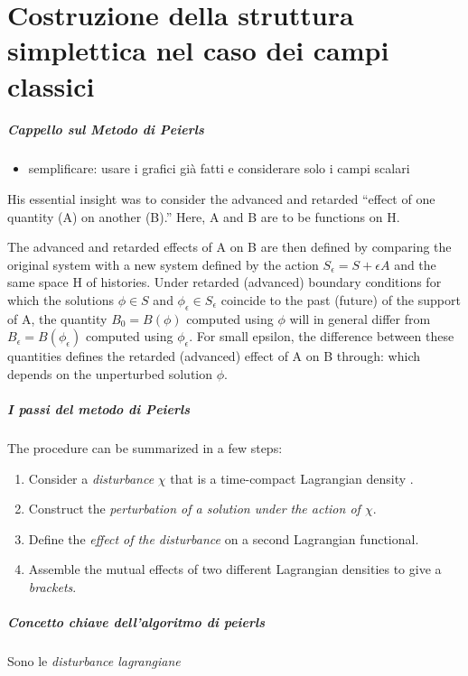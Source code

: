 \documentclass{beamer}
\begin{document}
	\part{Costruzione della struttura simplettica nel caso dei campi classici}
	\frame{\partpage}
	
	\begin{frame}
		\frametitle{Cappello sul Metodo di Peierls }
			\begin{itemize}
				\item semplificare: usare i grafici già fatti e considerare solo i campi scalari
			\end{itemize}
			His essential insight was to consider the advanced and retarded “effect of one quantity (A) on another (B).” Here, A and B are to
be functions on H. 

			The advanced  and retarded  effects of A on B are then defined by comparing the original system with a new system defined by the action $S_\epsilon = S + \epsilon A$ and the same space H of histories. 
			Under retarded (advanced) boundary conditions for which the solutions $\phi \in S$ and $\phi_\epsilon	\in S_\epsilon$ coincide to the past (future) of the support of A, the quantity $B_0 = B(\phi)$ computed using $\phi$ will in general differ from $B_\epsilon = B(\phi_\epsilon)$ computed using $\phi_\epsilon$.
			For small epsilon, the difference between these quantities defines the retarded (advanced) effect of A on B through:
which depends on the unperturbed solution $\phi$.
	\end{frame}
	
	\begin{frame}
		\frametitle{I passi del metodo di Peierls}
		The procedure can be summarized in a few steps:
	\begin{enumerate}
		\item Consider a \emph{disturbance} $\chi$ that is a time-compact Lagrangian density .
		\item Construct the \emph{perturbation of a solution under the action of $\chi$}.
		\item Define the \emph{effect of the disturbance} on a second Lagrangian functional.
		\item Assemble the mutual effects of two different Lagrangian densities to give a \emph{brackets}.
	\end{enumerate}	
	\end{frame}
	
	\begin{frame}
		\frametitle{ Concetto chiave dell'algoritmo di peierls}
		Sono le \emph{disturbance lagrangiane}
		
	\end{frame}
	
\end{document}
